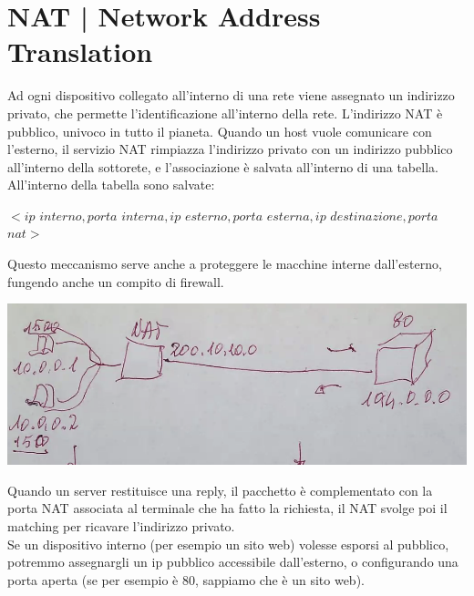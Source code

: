 \documentclass[11pt, oneside]{article}   	%
\begin{document}
\section*{NAT | Network Address Translation}
Ad ogni dispositivo collegato all'interno di una rete viene assegnato un indirizzo privato, che permette l'identificazione all'interno della rete. L'indirizzo NAT è pubblico, univoco in tutto il pianeta. Quando un host vuole comunicare con l'esterno, il servizio NAT rimpiazza l'indirizzo privato con un indirizzo pubblico all'interno della sottorete, e l'associazione è salvata all'interno di una tabella. All'interno della tabella sono salvate:
\begin{center}
$<ip$ $interno, porta$ $interna, ip$ $esterno, porta$ $esterna, ip$ $destinazione, porta$ $nat>$
\end{center}
Questo meccanismo serve anche a proteggere le macchine interne dall'esterno, fungendo anche un compito di firewall.
\begin{center}
\includegraphics[scale=0.5]{nat}
\end{center}
Quando un server restituisce una reply, il pacchetto è complementato con la porta NAT associata al terminale che ha fatto la richiesta, il NAT svolge poi il matching per ricavare l'indirizzo privato.\\
Se un dispositivo interno (per esempio un sito web) volesse esporsi al pubblico, potremmo assegnargli un ip pubblico accessibile dall'esterno, o configurando una porta aperta (se per esempio è 80, sappiamo che è un sito web).
\end{document}
